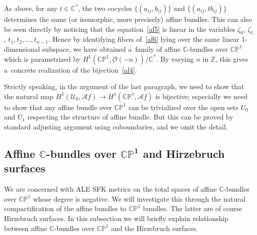 \documentclass[11pt]{article}
\numberwithin{equation}{section}
\begin{document}
As above, for any $t\in\mathbb{C}^*$, the two cocycles $\{(a_{ij}, b_{ij})\}$ and $\{(a_{ij}, tb_{ij})\}$ determines the
same (or isomorphic, more precisely) af\/f\/ine bundles.
This can also be seen directly by noticing that the equation~\eqref{af5} is linear in the variables
$\zeta_0$, $\zeta_1$, $t_1,t_2,\dots,t_{n-1}$.
Hence by identifying f\/ibers of~\eqref{af6} lying over the same linear 1-dimensional subspace, we have obtained
a~family of af\/f\/ine $\mathbb{C}$-bundles over $\mathbb{CP}^1$ which is parametrized by $H^1(\mathbb{CP}^1,\mathscr
O(-n))/\mathbb{C}^*$.
By varying $n$ in $\mathbb{Z}$, this gives a~concrete realization of the bijection~\eqref{af4}.

Strictly speaking, in the argument of the last paragraph, we need to show that the natural map $H^1(\mathscr
U_0,\mathscr Af)\to H^1(\mathbb{CP}^1,\mathscr Af)$ is bijective; especially we need to show that any af\/f\/ine bundle
over $\mathbb{CP}^1$ can be trivialized over the open sets $U_0$ and $U_1$ respecting the structure of af\/f\/ine
bundle.
But this can be proved by standard adjusting argument using coboundaries, and we omit the detail.

\subsection[Af\/f\/ine $\mathbb{C}$-bundles over $\mathbb{CP}^1$ and Hirzebruch surfaces]{Af\/f\/ine
$\boldsymbol{\mathbb{C}}$-bundles over $\boldsymbol{\mathbb{CP}^1}$ and Hirzebruch surfaces}
\label{ss:AH}

We are concerned with ALE SFK metrics on the total spaces of af\/f\/ine $\mathbb{C}$-bundles over $\mathbb{CP}^1$ whose
degree is negative.
We will investigate this through the natural compactif\/ication of the af\/f\/ine bundles to $\mathbb{CP}^1$ bundles.
The latter are of course Hirzebruch surfaces.
In this subsection we will brief\/ly explain relationship between af\/f\/ine $\mathbb{C}$-bundles over $\mathbb{CP}^1$
and the Hirzebruch surfaces.
\end{document}

